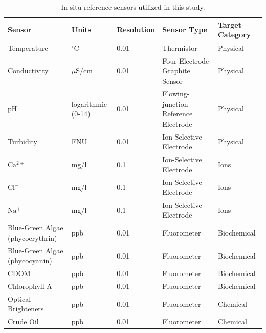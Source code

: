 \documentclass[remotesensing,article,submit,pdftex,moreauthors]{Definitions/mdpi}
\begin{document}
\begin{table}[t!] 
\caption{In-situ reference sensors utilized in this study.\label{tab:sensors}}
\begin{tabularx}{\textwidth}{CCCCC}
\toprule
\textbf{Sensor}	& \textbf{Units} & Resolution & \textbf{Sensor Type} & \textbf{Target Category}\\
\midrule
Temperature		                    & $^{\circ}$C        & 0.01  & Thermistor                           & Physical \\
Conductivity                        & $\mu$S/cm          & 0.01  & Four-Electrode Graphite Sensor       & Physical  \\
pH                                  & logarithmic (0-14) & 0.01  & Flowing-junction Reference Electrode & Physical \\
Turbidity                           & FNU                & 0.01  & Ion-Selective Electrode              & Physical \\
$\mathrm{Ca^{2+}}$                  & mg/l               & 0.1   & Ion-Selective Electrode              & Ions \\
$\mathrm{Cl^-}$                     & mg/l               & 0.1   & Ion-Selective Electrode              & Ions \\
$\mathrm{Na^+}$                     & mg/l               & 0.1   & Ion-Selective Electrode              & Ions \\
Blue-Green Algae (phycoerythrin)    & ppb                & 0.01  & Fluorometer                          & Biochemical \\
Blue-Green Algae (phycocyanin)      & ppb                & 0.01  & Fluorometer                          & Biochemical \\
CDOM                                & ppb                & 0.01  & Fluorometer                          & Biochemical \\
Chlorophyll A                       & ppb                & 0.01  & Fluorometer                          & Biochemical \\
Optical Brighteners                 & ppb                & 0.01  & Fluorometer                          & Chemical \\
Crude Oil                           & ppb                & 0.01  & Fluorometer                          & Chemical\\
\bottomrule
\end{tabularx}
\end{table}
\end{document}
